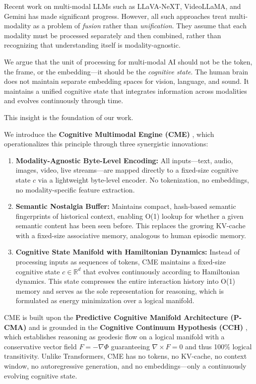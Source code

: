 \documentclass[
  11pt,
  a4paper,
]{article}
\begin{document}
Recent work on multi-modal LLMs such as LLaVA-NeXT, VideoLLaMA, and
Gemini has made significant progress. However, all such approaches treat
multi-modality as a problem of \emph{fusion} rather than
\emph{unification}. They assume that each modality must be processed
separately and then combined, rather than recognizing that understanding
itself is modality-agnostic.

We argue that the unit of processing for multi-modal AI should not be
the token, the frame, or the embedding---it should be the
\emph{cognitive state}. The human brain does not maintain separate
embedding spaces for vision, language, and sound. It maintains a unified
cognitive state that integrates information across modalities and
evolves continuously through time.

This insight is the foundation of our work.

We introduce the \textbf{Cognitive Multimodal Engine (CME)} , which
operationalizes this principle through three synergistic innovations:

\begin{enumerate}
\def\labelenumi{\arabic{enumi}.}
\item
  \textbf{Modality-Agnostic Byte-Level Encoding:} All inputs---text,
  audio, images, video, live streams---are mapped directly to a
  fixed-size cognitive state \(c\) via a lightweight byte-level encoder.
  No tokenization, no embeddings, no modality-specific feature
  extraction.
\item
  \textbf{Semantic Nostalgia Buffer:} Maintains compact, hash-based
  semantic fingerprints of historical context, enabling O(1) lookup for
  whether a given semantic content has been seen before. This replaces
  the growing KV-cache with a fixed-size associative memory, analogous
  to human episodic memory.
\item
  \textbf{Cognitive State Manifold with Hamiltonian Dynamics:} Instead
  of processing inputs as sequences of tokens, CME maintains a
  fixed-size cognitive state \(c \in \mathbb{R}^{d}\) that evolves
  continuously according to Hamiltonian dynamics. This state compresses
  the entire interaction history into O(1) memory and serves as the sole
  representation for reasoning, which is formulated as energy
  minimization over a logical manifold.
\end{enumerate}

CME is built upon the \textbf{Predictive Cognitive Manifold Architecture
(P-CMA)} and is grounded in the \textbf{Cognitive Continuum Hypothesis
(CCH)} , which establishes reasoning as geodesic flow on a logical
manifold with a conservative vector field \(F = -\nabla\Phi\)
guaranteeing \(\nabla \times F = 0\) and thus 100\% logical
transitivity. Unlike Transformers, CME has no tokens, no KV-cache, no
context window, no autoregressive generation, and no embeddings---only a
continuously evolving cognitive state.
\end{document}
